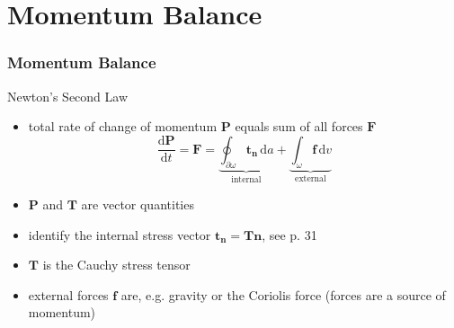 \documentclass[hide notes,intlimits]{beamer}
\begin{document}
\section{Momentum Balance}

\begin{frame}
  \frametitle{Momentum Balance}
  Newton's Second Law
  \begin{itemize}
    \item total rate of change of momentum $\mathbf{P}$ equals sum of all forces $\mathbf{F}$
    \begin{equation}
      \frac{\text{d} \mathbf{P}}{\text{d} t} = \mathbf{F} = \underbrace{\oint_{\partial \omega} \mathbf{t}_{\mathbf{n}} \, \text{d} a}_{\text{internal}} +\underbrace{\int_{\omega} \mathbf{f} \, \text{d} v}_{\text{external}}
    \end{equation}
    \item $\mathbf{P}$ and $\mathbf{T}$ are vector quantities
    \item identify the internal stress vector $\mathbf{t}_{\mathbf{n}} = \mathbf{T}\mathbf{n}$, see p. 31
    \item $\mathbf{T}$ is the \alert{Cauchy stress tensor}
    \item external forces $\mathbf{f}$ are, e.g. gravity or the Coriolis force (forces are a source of momentum)
    \end{itemize}    
  \end{frame}
\end{document}

